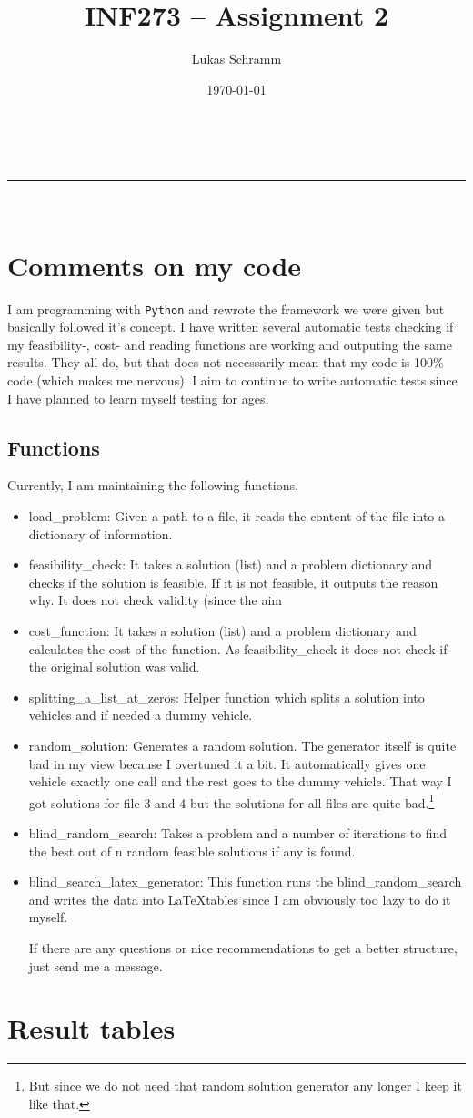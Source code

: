 \documentclass[a4paper,11pt]{article}
\makeatletter
\newcommand{\linia}{\rule{\linewidth}{0.5pt}}
\theoremstyle{mytheor}
\renewcommand{\maketitle}{
\begin{center}
\vspace{2ex}
{\huge \textsc{\@title}}
\vspace{1ex}
\\
\linia\\
\@author \hfill \@date
\vspace{4ex}
\end{center}
}
\makeatother
\begin{document}
\title{INF273 – Assignment 2}

\author{Lukas Schramm}

\date{\today}

\maketitle

\section{Comments on my code}
I am programming with \texttt{Python} and rewrote the framework we were given but basically followed it's concept. I have written several automatic tests checking if my feasibility-, cost- and reading functions are working and outputing the same results. They all do, but that does not necessarily mean that my code is 100\% code (which makes me nervous). I aim to continue to write automatic tests since I have planned to learn myself testing for ages.

\subsection{Functions}
Currently, I am maintaining the following functions.
\begin{itemize}
\item load\_problem: Given a path to a file, it reads the content of the file into a dictionary of information.
\item feasibility\_check: It takes a solution (list) and a problem dictionary and checks if the solution is feasible. If it is not feasible, it outputs the reason why. It does not check validity (since the aim
\item cost\_function: It takes a solution (list) and a problem dictionary and calculates the cost of the function. As feasibility\_check it does not check if the original solution was valid.
\item splitting\_a\_list\_at\_zeros: Helper function which splits a solution into vehicles and if needed a dummy vehicle.
\item random\_solution: Generates a random solution. The generator itself is quite bad in my view because I overtuned it a bit. It automatically gives one vehicle exactly one call and the rest goes to the dummy vehicle. That way I got solutions for file 3 and 4 but the solutions for all files are quite bad.\footnote{But since we do not need that random solution generator any longer I keep it like that.}
\item blind\_random\_search: Takes a problem and a number of iterations to find the best out of n random feasible solutions if any is found.
\item blind\_search\_latex\_generator: This function runs the blind\_random\_search and writes the data into \LaTeX tables since I am obviously too lazy to do it myself.

If there are any questions or nice recommendations to get a better structure, just send me a message.
\end{itemize}

\clearpage

\section{Result tables}

\end{document}
